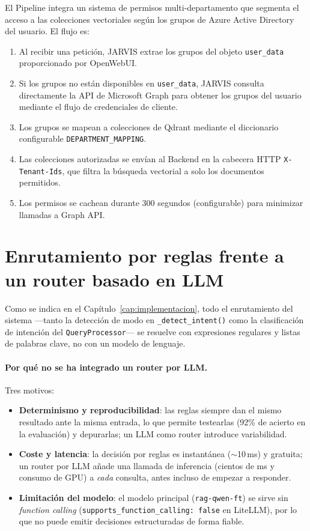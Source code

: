 El Pipeline integra un sistema de permisos multi-departamento que segmenta el acceso a las colecciones vectoriales según los grupos de Azure Active Directory del usuario. El flujo es:

\begin{enumerate}
    \item Al recibir una petición, JARVIS extrae los grupos del objeto \texttt{user\_data} proporcionado por OpenWebUI.
    \item Si los grupos no están disponibles en \texttt{user\_data}, JARVIS consulta directamente la API de Microsoft Graph para obtener los grupos del usuario mediante el flujo de credenciales de cliente.
    \item Los grupos se mapean a colecciones de Qdrant mediante el diccionario configurable \texttt{DEPARTMENT\_MAPPING}.
    \item Las colecciones autorizadas se envían al Backend en la cabecera HTTP \texttt{X-Tenant-Ids}, que filtra la búsqueda vectorial a solo los documentos permitidos.
    \item Los permisos se cachean durante 300 segundos (configurable) para minimizar llamadas a Graph API.
\end{enumerate}

\section{Enrutamiento por reglas frente a un router basado en LLM}
\label{anexo:router-llm}

Como se indica en el Capítulo~\ref{cap:implementacion}, todo el enrutamiento del sistema ---tanto la detección de modo en \texttt{\_detect\_intent()} como la clasificación de intención del \texttt{QueryProcessor}--- se resuelve con expresiones regulares y listas de palabras clave, no con un modelo de lenguaje.

\paragraph{Por qué no se ha integrado un router por LLM.} Tres motivos:
\begin{itemize}
    \item \textbf{Determinismo y reproducibilidad}: las reglas siempre dan el mismo resultado ante la misma entrada, lo que permite testearlas (92\% de acierto en la evaluación) y depurarlas; un LLM como router introduce variabilidad.
    \item \textbf{Coste y latencia}: la decisión por reglas es instantánea ($\sim$10\,ms) y gratuita; un router por LLM añade una llamada de inferencia (cientos de ms y consumo de GPU) a \emph{cada} consulta, antes incluso de empezar a responder.
    \item \textbf{Limitación del modelo}: el modelo principal (\texttt{rag-qwen-ft}) se sirve sin \textit{function calling} (\texttt{supports\_function\_calling: false} en LiteLLM), por lo que no puede emitir decisiones estructuradas de forma fiable.
\end{itemize}

